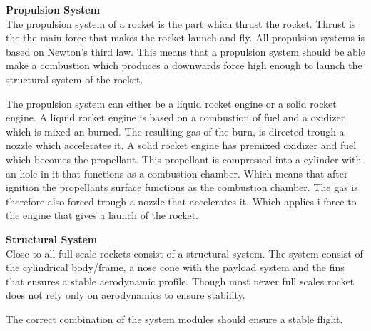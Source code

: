 \textbf{Propulsion System}\\
The propulsion system of a rocket is the part which thrust the rocket. Thrust is the the main force that makes the rocket launch and fly. All propulsion systems is based on Newton's third law. This means that a propulsion system should be able make a combustion which produces a downwards force high enough to launch the structural system of the rocket.


The propulsion system can either be a liquid rocket engine or a solid rocket engine. A liquid rocket engine is based on a combustion of fuel and a oxidizer which is mixed an burned. The resulting gas of the burn, is directed trough a nozzle which accelerates it.
A solid rocket engine has premixed oxidizer and fuel which becomes the propellant. This propellant is compressed into a cylinder with an hole in it that functions as a combustion chamber. Which means that after ignition the propellants surface functions as the combustion chamber. The gas is therefore also forced trough a nozzle that accelerates it. Which applies i force to the engine that gives a launch of the rocket. 


\textbf{Structural System}\\
Close to all full scale rockets consist of a structural system. The system consist of the cylindrical body/frame, a nose cone with the payload system and the fins that ensures a stable aerodynamic profile. Though most newer full scales rocket does not rely only on aerodynamics to ensure stability\cite{web:RocketStructure}.
\bigbreak   

The correct combination of the system modules should ensure a stable flight.  



